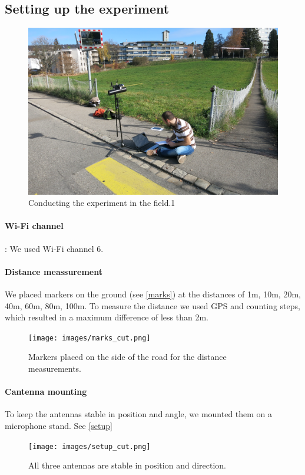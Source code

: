 \documentclass[12pt,a4paper]{article}
\begin{document}
	\subsection{Setting up the experiment}
		\begin{figure}
			\includegraphics[width=\textwidth]{images/cool.png}
			\caption{Conducting the experiment in the field.1}
			\label{cool}
		\end{figure}
		
		\paragraph{Wi-Fi channel}: We used Wi-Fi channel $6$.
		\paragraph{Distance meassurement} We placed markers on the ground (see \autoref{marks}) at the distances of 1m, 10m, 20m, 40m, 60m, 80m, 100m. To measure the distance we used GPS and counting steps, which resulted in a maximum difference of less than 2m.
		\begin{figure}
			\texttt{[image: images/marks\_cut.png]}
			\caption{Markers placed on the side of the road for the distance measurements.}
			\label{marks}
		\end{figure}
		\paragraph{Cantenna mounting} To keep the antennas stable in position and angle, we mounted them on a microphone stand. See \autoref{setup}
		\begin{figure}
			\begin{centering}
				\texttt{[image: images/setup\_cut.png]}
				\caption{All three antennas are stable in position and direction.}
				\label{setup}
			\end{centering}
		\end{figure}
\end{document}

